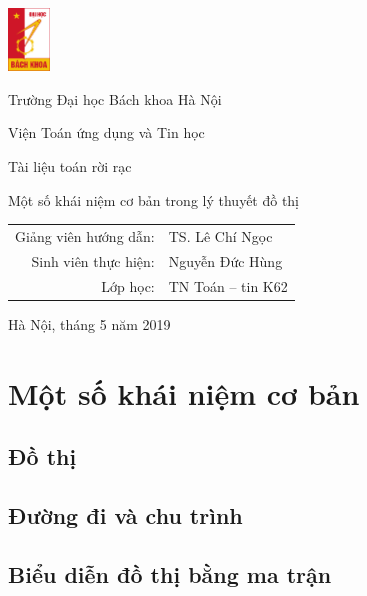 

\newcommand{\abs}[1]{\left\lvert#1\right\rvert}
\everymath{\displaystyle}
\renewcommand{\qedsymbol}{$\blacksquare$}


\pagestyle{plain}
\pagestyle{fancy}
\begin{titlepage}
	\begin{minipage}[c]{4em}
		\includegraphics[width=3em]{resources/bk.jpg}
	\end{minipage}
	\begin{minipage}[l]{\textwidth - 4em}
		{\Huge Trường Đại học Bách khoa Hà Nội\par}
		{\large Viện Toán ứng dụng và Tin học}
	\end{minipage}
	\vfill
	\vfill
	\begin{center}
		{\Large Tài liệu toán rời rạc}\par
		{\LARGE Một số khái niệm cơ bản trong lý thuyết đồ thị}\par
		\vfill
		{\large
			\begin{tabular}{rl}
				{ Giảng viên hướng dẫn}:&TS. Lê Chí Ngọc\\
				{ Sinh viên thực hiện:}& Nguyễn Đức Hùng\\
				{ Lớp học:} & TN Toán -- tin K62
			\end{tabular}
		}
		\vfill
		{\large Hà Nội, tháng 5 năm 2019}
	\end{center}
\end{titlepage}
\tableofcontents

\chapter{Một số khái niệm cơ bản}
\section{Đồ thị}


\section{Đường đi và chu trình}


\section{Biểu diễn đồ thị bằng ma trận}


